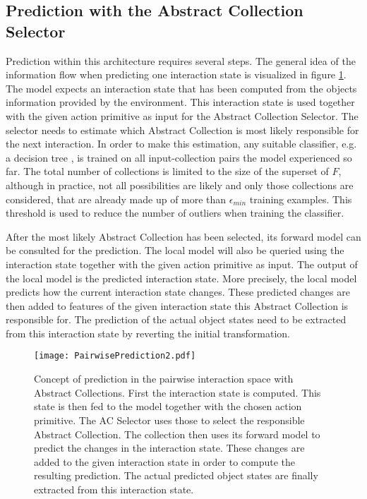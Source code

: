 
\subsection{Prediction with the Abstract Collection Selector \label{sec:pairPrediction}}
Prediction within this architecture requires several steps. The general idea of the information flow when predicting one interaction state is visualized in figure \ref{fig:PairPrediction}. The model expects an interaction state that has been computed from the objects information provided by the environment. This interaction state is used together with the given action primitive as input for the Abstract Collection Selector. The selector needs to estimate which Abstract Collection is most likely responsible for the next interaction. In order to make this estimation, any suitable classifier, e.g. a decision tree \cite{DT}, is trained on all input-collection pairs the model experienced so far. 
The total number of collections is limited to the size of the superset of $F$, although in practice, not all possibilities are likely and only those collections are considered, that are already made up of more than $\epsilon_{min}$ training examples. This threshold is used to reduce the number of outliers when training the classifier. %

After the most likely Abstract Collection has been selected, its forward model can be consulted for the prediction. The local model will also be queried using the interaction state together with the given action primitive as input. The output of the local model is the predicted interaction state. 
More precisely, the local model predicts how the current interaction state changes. These predicted changes are then added to features of the given interaction state this Abstract Collection is responsible for.
The prediction of the actual object states need to be extracted from this interaction state by reverting the initial transformation.

\begin{figure}
	\centering
	\texttt{[image: PairwisePrediction2.pdf]}
	\caption{Concept of prediction in the pairwise interaction space with Abstract Collections. First the interaction state is computed. This state is then fed to the model together with the chosen action primitive. The AC Selector uses those to select the responsible Abstract Collection. The collection then uses its forward model to predict the changes in the interaction state. These changes are added to the given interaction state in order to compute the resulting prediction. The actual predicted object states are finally extracted from this interaction state.} 
	\label{fig:PairPrediction}
\end{figure}

